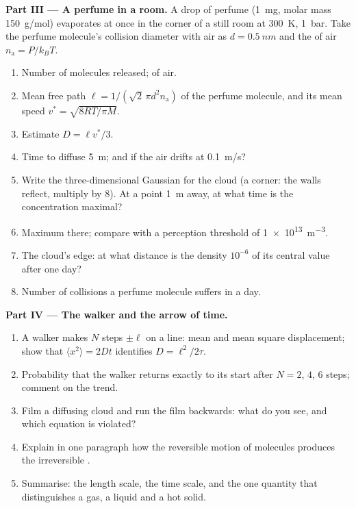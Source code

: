 \begin{problem}
\textbf{Part III --- A perfume in a room.}
A drop of perfume (\qty{1}{mg}, molar mass \qty{150}{g/mol}) evaporates
at once in the corner of a still room at \qty{300}{K}, \qty{1}{bar}.
Take the perfume molecule's collision diameter with air as $d =
\qty{0.5}{nm}$ and the  of air $n_{\text{a}} = P/k_BT$.
\begin{enumerate}[resume]
  \item Number of molecules released;  of air.
  \item Mean free path $\ell = 1/(\sqrt2\,\pi d^2 n_{\text{a}})$ of the
        perfume molecule, and its mean speed $v^* = \sqrt{8RT/\pi M}$.
  \item Estimate $D = \ell v^*/3$.
  \item Time to diffuse \qty{5}{m}; and if the air drifts at
        \qty{0.1}{m/s}?
  \item Write the three-dimensional Gaussian for the cloud (a corner:
        the walls reflect, multiply by $8$). At a point \qty{1}{m} away,
        at what time is the concentration maximal?
  \item Maximum  there; compare with a perception
        threshold of \qty{1e13}{m^{-3}}.
  \item The cloud's edge: at what distance is the density $10^{-6}$ of
        its central value after one day?
  \item Number of collisions a perfume molecule suffers in a day.
\end{enumerate}

\textbf{Part IV --- The walker and the arrow of time.}
\begin{enumerate}[resume]
  \item A walker makes $N$ steps $\pm\ell$ on a line: mean and mean
        square displacement; show that $\langle x^2\rangle = 2Dt$
        identifies $D = \ell^2/2\tau$.
  \item Probability that the walker returns exactly to its start after
        $N = 2$, $4$, $6$ steps; comment on the trend.
  \item Film a diffusing cloud and run the film backwards: what do you
        see, and which equation is violated?
  \item Explain in one paragraph how the reversible motion of molecules
        produces the irreversible .
  \item Summarise: the length scale, the time scale, and the one
        quantity that distinguishes a gas, a liquid and a hot solid.
\end{enumerate}
\end{problem}

